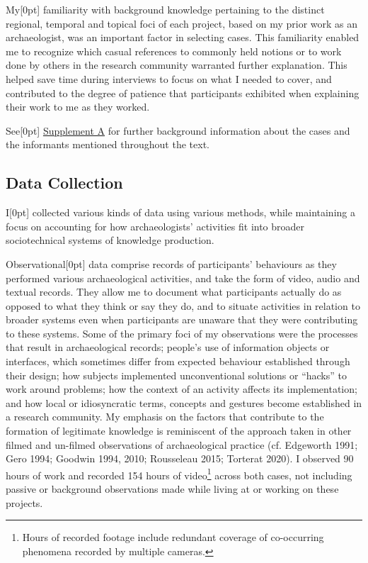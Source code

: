 \documentclass[
]{article}
\newcommand{\paragraphnumber}[1]{\marginnote{\color{lightgray}\tiny{#1}}[0pt]}
\begin{document}
My\paragraphnumber{[29]} familiarity with background knowledge
pertaining to the distinct regional, temporal and topical foci of each
project, based on my prior work as an archaeologist, was an important
factor in selecting cases. This familiarity enabled me to recognize
which casual references to commonly held notions or to work done by
others in the research community warranted further explanation. This
helped save time during interviews to focus on what I needed to cover,
and contributed to the degree of patience that participants exhibited
when explaining their work to me as they worked.

See\paragraphnumber{[30]} \hyperref[supplement-a]{Supplement A} for
further background information about the cases and the informants
mentioned throughout the text.

\subsection{Data Collection}\label{data-collection}

I\paragraphnumber{[31]} collected various kinds of data using various
methods, while maintaining a focus on accounting for how archaeologists'
activities fit into broader sociotechnical systems of knowledge
production.

Observational\paragraphnumber{[32]} data comprise records of
participants' behaviours as they performed various archaeological
activities, and take the form of video, audio and textual records. They
allow me to document what participants actually do as opposed to what
they think or say they do, and to situate activities in relation to
broader systems even when participants are unaware that they were
contributing to these systems. Some of the primary foci of my
observations were the processes that result in archaeological records;
people's use of information objects or interfaces, which sometimes
differ from expected behaviour established through their design; how
subjects implemented unconventional solutions or ``hacks'' to work
around problems; how the context of an activity affects its
implementation; and how local or idiosyncratic terms, concepts and
gestures become established in a research community. My emphasis on the
factors that contribute to the formation of legitimate knowledge is
reminiscent of the approach taken in other filmed and un-filmed
observations of archaeological practice (cf. Edgeworth 1991; Gero 1994;
Goodwin 1994, 2010; Rousseleau 2015; Torterat 2020). I observed 90 hours
of work and recorded 154 hours of video\footnote{Hours of recorded
  footage include redundant coverage of co-occurring phenomena recorded
  by multiple cameras.} across both cases, not including passive or
background observations made while living at or working on these
projects.
\end{document}

